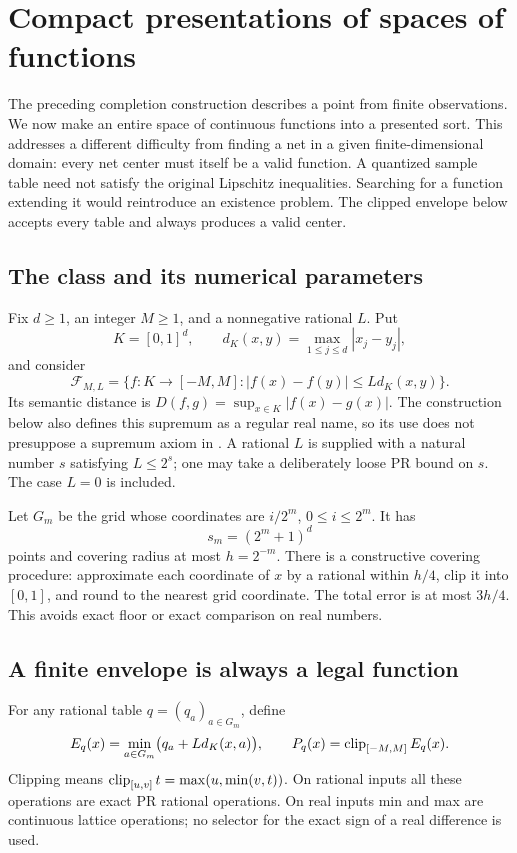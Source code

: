 \section{Compact presentations of spaces of functions}\label{sec:functionspaces}

The preceding completion construction describes a point from finite observations. We now make an entire space of continuous functions into a presented sort. This addresses a different difficulty from finding a net in a given finite-dimensional domain: every net center must itself be a valid function. A quantized sample table need not satisfy the original Lipschitz inequalities. Searching for a function extending it would reintroduce an existence problem. The clipped envelope below accepts every table and always produces a valid center.

\subsection{The class and its numerical parameters}

Fix \(d\geq1\), an integer \(M\geq1\), and a nonnegative rational \(L\). Put
\[
 K=[0,1]^d,\qquad d_K(x,y)=\max_{1\leq j\leq d}|x_j-y_j|,
\]
and consider
\[
 \mathcal F_{M,L}=\{f:K\to[-M,M]:
       |f(x)-f(y)|\leq Ld_K(x,y)\}.
\]
Its semantic distance is \(D(f,g)=\sup_{x\in K}|f(x)-g(x)|\). The construction below also defines this supremum as a regular real name, so its use does not presuppose a supremum axiom in \ipra. A rational \(L\) is supplied with a natural number \(s\) satisfying \(L\leq2^s\); one may take a deliberately loose PR bound on \(s\). The case \(L=0\) is included.

Let \(G_m\) be the grid whose coordinates are \(i/2^m\), \(0\leq i\leq2^m\). It has
\[
 s_m=(2^m+1)^d
\]
points and covering radius at most \(h=2^{-m}\). There is a constructive covering procedure: approximate each coordinate of \(x\) by a rational within \(h/4\), clip it into \([0,1]\), and round to the nearest grid coordinate. The total error is at most \(3h/4\). This avoids exact floor or exact comparison on real numbers.

\subsection{A finite envelope is always a legal function}

For any rational table \(q=(q_a)_{a\in G_m}\), define
\begin{equation}
 E_q(x)=\min_{a\in G_m}\bigl(q_a+Ld_K(x,a)\bigr),\qquad
 P_q(x)=\operatorname{clip}_{[-M,M]}E_q(x).
 \label{eq:envelope}
\end{equation}
Clipping means \(\operatorname{clip}_{[u,v]}t=\max(u,\min(v,t))\). On rational inputs all these operations are exact PR rational operations. On real inputs min and max are continuous lattice operations; no selector for the exact sign of a real difference is used.

